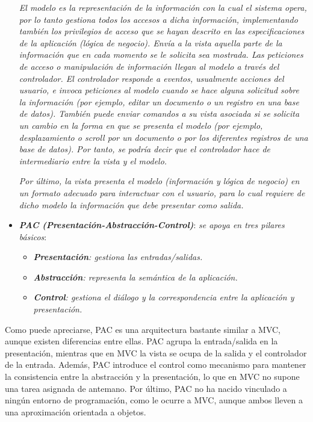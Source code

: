 \documentclass[11pt,oneside]{book}
\begin{document}
\begin{itemize}
\textit{El modelo es la representación de la información con la cual el sistema opera, por lo tanto gestiona todos los accesos a dicha información, implementando también los privilegios de acceso que se hayan descrito en las especificaciones de la aplicación (lógica de negocio). Envía a la vista aquella parte de la información que en cada momento se le solicita sea mostrada. Las peticiones de acceso o manipulación de información llegan al modelo a través del controlador. El controlador responde a eventos, usualmente acciones del usuario, e invoca peticiones al modelo cuando se hace alguna solicitud sobre la información (por ejemplo, editar un documento o un registro en una base de datos). También puede enviar comandos a su vista asociada si se solicita un cambio en la forma en que se presenta el modelo (por ejemplo, desplazamiento o scroll por un documento o por los diferentes registros de una base de datos). Por tanto, se podría decir que el controlador hace de intermediario entre la vista y el modelo.} 

\textit{Por último, la vista presenta el modelo (información y lógica de negocio) en un formato adecuado para interactuar con el usuario, para lo cual requiere de dicho modelo la información que debe presentar como salida.}

\newpage
\item \textit{\textbf{PAC (Presentación-Abstracción-Control)}}: \textit{se apoya en tres pilares básicos}:
\begin{itemize}
\item \textit{\textbf{Presentación}: gestiona las entradas/salidas.}
\item \textit{\textbf{Abstracción}: representa la semántica de la aplicación.}
\item \textit{\textbf{Control}: gestiona el diálogo y la correspondencia entre la aplicación y presentación.}
\end{itemize}
\end{itemize}

Como puede apreciarse, PAC es una arquitectura bastante similar a MVC, aunque existen diferencias entre ellas. PAC agrupa la entrada/salida en la presentación, mientras que en MVC la vista se ocupa de la salida y el controlador de la entrada. Además, PAC introduce el control como mecanismo para mantener la consistencia entre la abstracción y la presentación, lo que en MVC no supone una tarea asignada de antemano. Por último, PAC no ha nacido vinculado a ningún entorno de programación, como le ocurre a MVC, aunque ambos lleven a una aproximación orientada a objetos.
\end{document}
